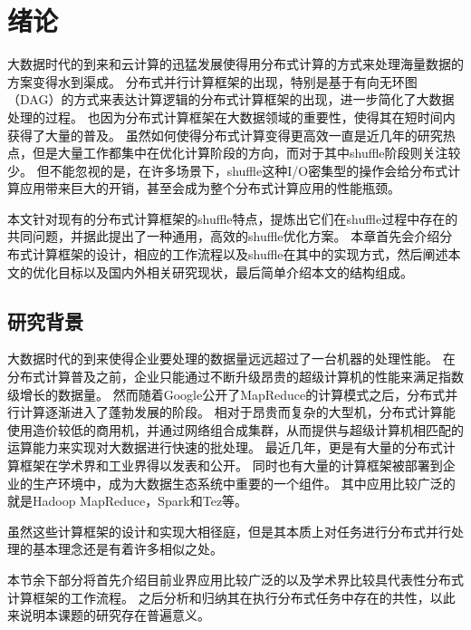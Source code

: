 
\chapter{绪论}
\label{chap:intro}

大数据时代的到来和云计算的迅猛发展使得用分布式计算的方式来处理海量数据的方案变得水到渠成。
分布式并行计算框架的出现，特别是基于有向无环图（DAG）的方式来表达计算逻辑的分布式计算框架的出现，进一步简化了大数据处理的过程。
也因为分布式计算框架在大数据领域的重要性，使得其在短时间内获得了大量的普及。
虽然如何使得分布式计算变得更高效一直是近几年的研究热点，但是大量工作都集中在优化计算阶段的方向，而对于其中shuffle阶段则关注较少。
但不能忽视的是，在许多场景下，shuffle这种I/O密集型的操作会给分布式计算应用带来巨大的开销，甚至会成为整个分布式计算应用的性能瓶颈。

本文针对现有的分布式计算框架的shuffle特点，提炼出它们在shuffle过程中存在的共同问题，并据此提出了一种通用，高效的shuffle优化方案。
本章首先会介绍分布式计算框架的设计，相应的工作流程以及shuffle在其中的实现方式，然后阐述本文的优化目标以及国内外相关研究现状，最后简单介绍本文的结构组成。

\section{研究背景}

大数据时代的到来使得企业要处理的数据量远远超过了一台机器的处理性能。
在分布式计算普及之前，企业只能通过不断升级昂贵的超级计算机的性能来满足指数级增长的数据量。
然而随着Google公开了MapReduce\cite{mapreduce}的计算模式之后，分布式并行计算逐渐进入了蓬勃发展的阶段。
相对于昂贵而复杂的大型机，分布式计算能使用造价较低的商用机，并通过网络组合成集群，从而提供与超级计算机相匹配的运算能力来实现对大数据进行快速的批处理。
最近几年，更是有大量的分布式计算框架在学术界和工业界得以发表和公开。
同时也有大量的计算框架被部署到企业的生产环境中，成为大数据生态系统中重要的一个组件。
其中应用比较广泛的就是Hadoop MapReduce\cite{hadoop}，Spark\cite{apachespark}和Tez\cite{tez}等。

虽然这些计算框架的设计和实现大相径庭，但是其本质上对任务进行分布式并行处理的基本理念还是有着许多相似之处。

本节余下部分将首先介绍目前业界应用比较广泛的以及学术界比较具代表性分布式计算框架的工作流程。
之后分析和归纳其在执行分布式任务中存在的共性，以此来说明本课题的研究存在普遍意义。

